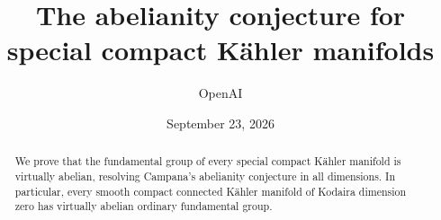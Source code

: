 \documentclass[11pt]{article}
\title{The abelianity conjecture for\\special compact K\"ahler manifolds}
\author{OpenAI}
\date{September 23, 2026}
\begin{document}
\maketitle
\begin{abstract}
We prove that the fundamental group of every special compact K\"ahler
manifold is virtually abelian, resolving Campana's abelianity conjecture
in all dimensions. In particular, every smooth compact connected
K\"ahler manifold of Kodaira dimension zero has virtually abelian
ordinary fundamental group.
\end{abstract}
\begingroup
\small
\renewcommand{\baselinestretch}{0.9}\selectfont
\tableofcontents
\endgroup







\begingroup
\small
\RaggedRight

\endgroup
\end{document}
